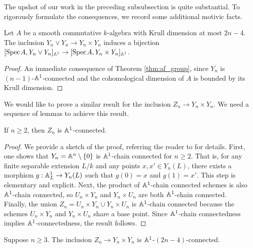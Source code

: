 The upshot of our work in the preceding subsubsection is quite substantial. To rigorously formulate the consequences, we record some additional motivic facts. 

\begin{lemma}\label{lem:easy}
    Let $A$ be a smooth commutative $k$-algebra with Krull dimension at most $2n-4$. The inclusion $Y_n \vee Y_n \to Y_n \times Y_n$ induces a bijection $[\text{Spec}\hspace{0.1em} A, Y_n \vee Y_n]_{\mathbb{A}^1} \to [\text{Spec}\hspace{0.1em} A, Y_n \times Y_n]_{\mathbb{A}^1}$. 
\end{lemma}

\begin{proof}
    An immediate consequence of Theorem \ref{thm:af_group}, since $Y_n$ is $(n-1)$-$\mathbb{A}^1$-connected and the cohomological dimension of $A$ is bounded by its Krull dimension.
\end{proof}

We would like to prove a similar result for the inclusion $Z_n \to Y_n \times Y_n$. We need a sequence of lemmas to achieve this result.

\begin{lemma}\cite[Lemma 4.5]{Lerbet}
    If $n \geq 2$, then $Z_n$ is $\mathbb{A}^1$-connected. 
\end{lemma}

\begin{proof}
    We provide a sketch of the proof, referring the reader to \cite[Lemma 5.5]{Lerbet} for details. First, one shows that $Y_n = \mathbb{A}^n \setminus \{0\}$ is $\mathbb{A}^1$-chain connected for $n \geq 2$. That is, for any finite separable extension $L/k$ and any points $x,x' \in Y_n(L)$, there exists a morphism $g: \mathbb{A}^1_L \to Y_n(L)$ such that $g(0) = x$ and $g(1) = x'$. This step is elementary and explicit. Next, the product of $\mathbb{A}^1$-chain connected schemes is also $\mathbb{A}^1$-chain connected, so $U_n \times Y_n$ and $Y_n \times U_n$ are both $\mathbb{A}^1$-chain connected. Finally, the union $Z_n = U_n \times Y_n \cup Y_n \times U_n$ is $\mathbb{A}^1$-chain connected because the schemes $U_n \times Y_n$ and $Y_n \times U_n$ share a base point. Since $\mathbb{A}^1$-chain connectedness implies $\mathbb{A}^1$-connectedness, the result follows.
\end{proof}

\begin{lemma}\cite[Lemma 5.6]{Lerbet}
    Suppose $n \geq 3$. The inclusion $Z_n \to Y_n \times Y_n$ is $\mathbb{A}^1$-$(2n-4)$-connected.
\end{lemma}

